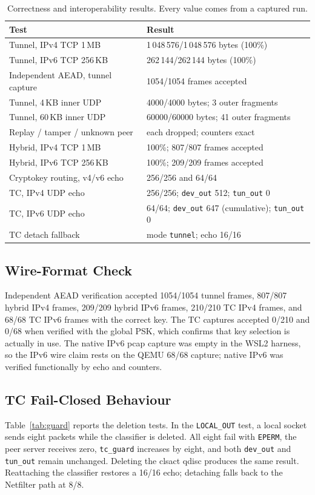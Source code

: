 \documentclass[conference]{IEEEtran}
\newcommand{\code}[1]{\texttt{#1}}
\begin{document}
\begin{table}[t]
\centering
\caption{Correctness and interoperability results. Every value comes from a captured run.}
\label{tab:correctness}
\footnotesize
\setlength{\tabcolsep}{3pt}
\begin{tabular}{@{}p{}p{}@{}}
\toprule
Test & Result \\
\midrule
Tunnel, IPv4 TCP 1\,MB & 1\,048\,576/1\,048\,576 bytes (100\%) \\
Tunnel, IPv6 TCP 256\,KB & 262\,144/262\,144 bytes (100\%) \\
Independent AEAD, tunnel capture & 1054/1054 frames accepted \\
Tunnel, 4\,KB inner UDP & 4000/4000 bytes; 3 outer fragments \\
Tunnel, 60\,KB inner UDP & 60000/60000 bytes; 41 outer fragments \\
Replay / tamper / unknown peer & each dropped; counters exact \\
Hybrid, IPv4 TCP 1\,MB & 100\%; 807/807 frames accepted \\
Hybrid, IPv6 TCP 256\,KB & 100\%; 209/209 frames accepted \\
Cryptokey routing, v4/v6 echo & 256/256 and 64/64 \\
TC, IPv4 UDP echo & 256/256; \code{dev\_out} 512; \code{tun\_out} 0 \\
TC, IPv6 UDP echo & 64/64; \code{dev\_out} 647 (cumulative); \code{tun\_out} 0 \\
TC detach fallback & mode \code{tunnel}; echo 16/16 \\
\bottomrule
\end{tabular}
\end{table}

\subsection{Wire-Format Check}
Independent AEAD verification accepted 1054/1054 tunnel frames, 807/807 hybrid IPv4 frames, 209/209 hybrid IPv6 frames, 210/210 TC IPv4 frames, and 68/68 TC IPv6 frames with the correct key. The TC captures accepted 0/210 and 0/68 when verified with the global PSK, which confirms that key selection is actually in use. The native IPv6 pcap capture was empty in the WSL2 harness, so the IPv6 wire claim rests on the QEMU 68/68 capture; native IPv6 was verified functionally by echo and counters.

\subsection{TC Fail-Closed Behaviour}
Table~\ref{tab:guard} reports the deletion tests. In the \code{LOCAL\_OUT} test, a local socket sends eight packets while the classifier is deleted. All eight fail with \code{EPERM}, the peer server receives zero, \code{tc\_guard} increases by eight, and both \code{dev\_out} and \code{tun\_out} remain unchanged. Deleting the clsact qdisc produces the same result. Reattaching the classifier restores a 16/16 echo; detaching falls back to the Netfilter path at 8/8.
\end{document}
